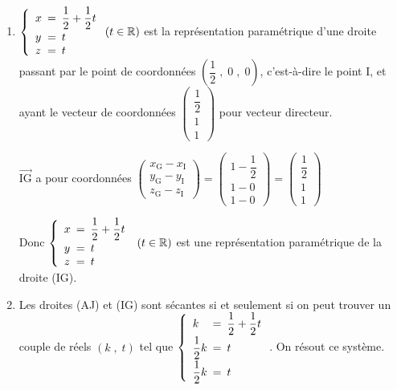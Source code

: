 \documentclass[10pt]{article}
\providecommand{\R}{\mathbb{R}}
\providecommand{\vectt}[1]{\overrightarrow{\mathrm{#1}}}
\begin{document}
\begin{enumerate}
\begin{enumerate}
La droite (AJ) a donc pour représentation paramétrique
$\left \{
\begin{array}{l !{=} l }
x & k \\
y & \dfrac{k}{2} \\[5pt]
z & \dfrac{k}{2}
\end{array}
\right. \text{avec } k\in \R
$
\item 
$\left\{
\begin{array}{l !{=} l }
x & \dfrac{1}{2}+\dfrac{1}{2} t \\[5pt]
y &  t \\
z & t\end{array}
\right. (t\in\R)$
est la représentation paramétrique d'une droite passant par le point de coordonnées 
$\left( \dfrac{1}{2}\;,\; 0 \;,\; 0\right )$, c'est-à-dire le point I, et  ayant le vecteur de coordonnées 
$\begin{pmatrix}
\dfrac{1}{2} \\[5pt] 1 \\ 1
\end{pmatrix}$
pour vecteur directeur.

$\vectt{IG}$ a pour coordonnées 
$\begin{pmatrix}
x_{\text{G}} - x_{\text{I}} \\ y_{\text{G}} - y_{\text{I}} \\ z_{\text{G}} - z_{\text{I}}
\end{pmatrix}
=
\begin{pmatrix}
1-\dfrac{1}{2}\\[5pt] 1-0 \\ 1-0
\end{pmatrix}
=
\begin{pmatrix}
\dfrac{1}{2}\\[5pt] 1 \\ 1
\end{pmatrix}$

Donc $\left\{
\begin{array}{l !{=} l }
x & \dfrac{1}{2}+\dfrac{1}{2} t  \\[5pt]
y & t \\
z & t
\end{array} 
\right.\; (t\in\R)$
est une représentation paramétrique de la droite (IG).

			\item
Les droites (AJ) et (IG) sont sécantes si et seulement si on peut trouver un couple de réels $\left (k\;,\;t\right )$ tel que
$\left\{
\begin{array}{l !{=} l }
k & \dfrac{1}{2}+\dfrac{1}{2} t \\[5pt]
\dfrac{1}{2}k & t \\[5pt]
\dfrac{1}{2}k & t
\end{array} 
\right.$.
On résout ce système.


\end{enumerate}
\end{enumerate}
\end{document}
